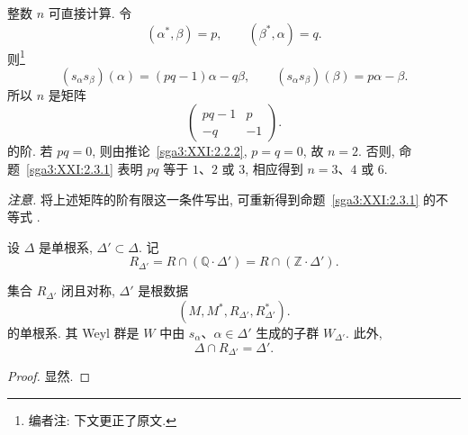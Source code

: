\begin{remark}\label{sga3:XXI:3.4.5}
整数 \(n\) 可直接计算. 令
\[
 (\alpha^\ast,\beta)=p,\qquad
 (\beta^\ast,\alpha)=q.
\]
则\footnote{编者注: 下文更正了原文.}
\[
 (s_\alpha s_\beta)(\alpha)=(pq-1)\alpha-q\beta,
 \qquad
 (s_\alpha s_\beta)(\beta)=p\alpha-\beta.
\]
所以 \(n\) 是矩阵
\[
 \begin{pmatrix}
  pq-1 & p\\
  -q   & -1
 \end{pmatrix}.
\]
的阶. 若 \(pq=0\), 则由推论~\ref{sga3:XXI:2.2.2}, \(p=q=0\), 故 \(n=2\). 否则, 命题~\ref{sga3:XXI:2.3.1} 表明 \(pq\) 等于 \(1\)、\(2\) 或 \(3\), 相应得到 \(n=3\)、\(4\) 或 \(6\).

\smallskip
\noindent
\emph{注意.} 将上述矩阵的阶有限这一条件写出, 可重新得到命题~\ref{sga3:XXI:2.3.1} 的不等式 .
\end{remark}

\begin{definition}\label{sga3:XXI:3.4.6}
设 \(\Delta\) 是单根系, \(\Delta'\subset\Delta\). 记
\[
 R_{\Delta'}
   =R\cap(\mathbb{Q}\cdot\Delta')
   =R\cap(\mathbb{Z}\cdot\Delta').
\]
\end{definition}

\begin{lemma}\label{sga3:XXI:3.4.7}
集合 \(R_{\Delta'}\) 闭且对称, \(\Delta'\) 是根数据
\[
 (M,M^\ast,R_{\Delta'},R_{\Delta'}^\ast).
\]
的单根系. 其 Weyl 群是 \(W\) 中由 \(s_\alpha\)、\(\alpha\in\Delta'\) 生成的子群 \(W_{\Delta'}\). 此外,
\[
 \Delta\cap R_{\Delta'}=\Delta'.
\]
\end{lemma}
\begin{proof}
显然.
\end{proof}


